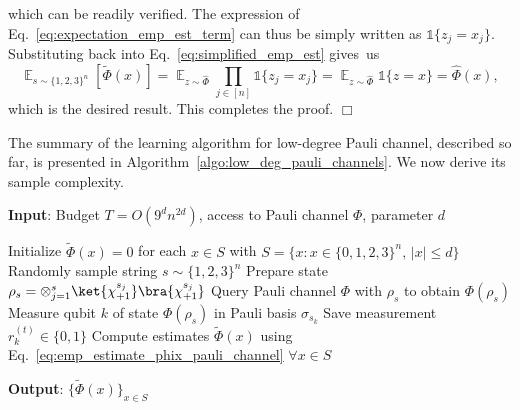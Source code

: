 \documentclass[11pt]{article}
\theoremstyle{plain}
\theoremstyle{plain}
\theoremstyle{definition}
\theoremstyle{remark}
\renewenvironment{proof}[1][]{
    \begin{trivlist}
    \item[\hspace{\labelsep}{\em\noindent Proof#1:\/}]}
    {{\hfill$\Box$}
    \end{trivlist}
}
\theoremstyle{named}
\begin{document}
\begin{proof}
\begin{equation}
    \label{eq:expectation_emp_est_term}
\end{equation}
which can be readily verified.
The expression of Eq.~\ref{eq:expectation_emp_est_term} can thus be simply written as $\mathds{1}\{z_j = x_j\}$. Substituting back into Eq.~\ref{eq:simplified_emp_est} gives~us
\begin{equation}
    \mathop{\mathbb{E}}_{s \sim \{1,2,3\}^n}\left[ \widetilde{\Phi}(x) \right] = \mathop{\mathbb{E}}_{z \sim \widehat{\Phi}} \prod_{j \in [n]} \mathds{1}\{z_j = x_j\} = \mathop{\mathbb{E}}_{z \sim \widehat{\Phi}} \mathds{1}\{z = x\} = \widehat{\Phi}(x),
\end{equation}
which is the desired result. This completes the proof.
\end{proof}


The summary of the learning algorithm for low-degree Pauli channel, described so far, is presented in Algorithm~\ref{algo:low_deg_pauli_channels}. We now derive its sample complexity.

\begin{algorithm}[H]
    \caption{Learning low-degree Pauli channels through unentangled measurements} \label{algo:low_deg_pauli_channels}
    \textbf{Input}: Budget $T=O(9^dn^{2d})$, access to Pauli channel $\Phi$, parameter $d$
    \begin{algorithmic}[1]
        \State Initialize $\widetilde{\Phi}(x) = 0$ for each $x \in S$ with $S = \{x : x \in \{0,1,2,3\}^n, \, |x|\leq d\}$
            \State Randomly sample string $s \sim \{1,2,3\}^n$
            \State Prepare state $\rho_s = \otimes_{j=1}^s \ket{\chi_{+1}^{s_j}}\bra{\chi_{+1}^{s_j}}$
            \State Query Pauli channel $\Phi$ with $\rho_s$ to obtain $\Phi(\rho_s)$
                \State Measure qubit $k$ of state $\Phi(\rho_s)$ in Pauli basis $\sigma_{s_k}$
                \State Save measurement $r^{(t)}_k \in \{0,1\}$
            \EndFor
        \EndFor 
        \State Compute estimates $\widetilde{\Phi}(x)$ using Eq.~\ref{eq:emp_estimate_phix_pauli_channel} $\forall x \in S$
    \end{algorithmic}
    \textbf{Output}: $\{\widetilde{\Phi}(x)\}_{x \in S}$
\end{algorithm}
\end{document}
